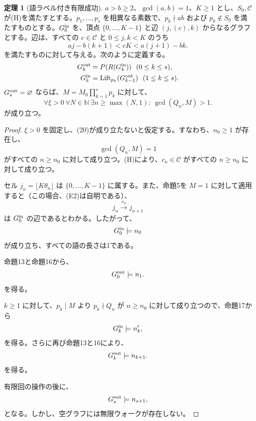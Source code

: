 \documentclass[11pt,reqno]{amsart}
\theoremstyle{definition}
\newtheorem{theorem}{定理}
\theoremstyle{definition}
\theoremstyle{remark}
\begin{document}
\begin{samepage}
\begin{theorem}[語ラベル付き有限成功]\leavevmode\label{thm:19}
\(a>b\ge2\)、\(\gcd(a,b)=1\)、\(K\ge1\) とし、\(S_0,\mathcal C\) が(H)を満たすとする。\(p_1,\ldots,p_s\) を相異なる素数で、\(p_k\nmid ab\) および \(p_k\notin S_0\) を満たすものとする。\(G_0^{\rm in}\) を、頂点 \(\{0,\ldots,K-1\}\) と辺 \((j,(c),k)\) からなるグラフとする。辺は、すべての \(c\in\mathcal C\) と \(0\le j,k<K\) のうち
\[
aj-b(k+1)<cK<a(j+1)-bk.
\]
を満たすものに対して与える。次のように定義する。
\[
\begin{aligned}
G_k^{\rm out}&=P(R(G_k^{\rm in}))\ \ (0\le k\le s),\\
G_k^{\rm in}&=\operatorname{Lift}_{p_k}(G_{k-1}^{\rm out})\ \ (1\le k\le s).
\end{aligned}
\]
\(G_s^{\rm out}=\varnothing\) ならば、\(M=M_0\prod_{k=1}^sp_k\) に対して、
\[
\forall\xi>0\ \forall N\in\mathbb N\ \exists n\ge\max(N,1):\
\gcd(Q_n,M)>1.
\tag{20}\label{eq:20}
\]
が成り立つ。
\label{thm-end:19}
\end{theorem}
\end{samepage}

\begin{proof}\leavevmode\label{proof:19}
\(\xi>0\) を固定し、(20)が成り立たないと仮定する。すなわち、\(n_0\ge1\) が存在し、
\[
\gcd(Q_n,M)=1
\]
がすべての \(n\ge n_0\) に対して成り立つ。(H)により、\(c_n\in\mathcal C\) がすべての \(n\ge n_0\) に対して成り立つ。

セル
\(j_n=\lfloor K\theta_n\rfloor\)
は \(\{0,\ldots,K-1\}\) に属する。また、命題5を \(M=1\) に対して適用すると（この場合、(E2)は自明である）、
\[
j_n\xrightarrow{c_n}j_{n+1}
\]
は \(G_0^{\rm in}\) の辺であるとわかる。したがって、
\[
G_0^{\rm in}\models n_0
\]
が成り立ち、すべての語の長さは1である。

命題13と命題16から、
\[
G_0^{\rm out}\models n_1.
\]
を得る。

\(k\ge1\) に対して、\(p_k\mid M\) より \(p_k\nmid Q_n\) が \(n\ge n_0\) に対して成り立つので、命題17から
\[
G_k^{\rm in}\models n'_k,
\]
を得る。さらに再び命題13と16により、
\[
G_k^{\rm out}\models n_{k+1}.
\]
を得る。

有限回の操作の後に、
\[
G_s^{\rm out}\models n_{s+1},
\]
となる。しかし、空グラフには無限ウォークが存在しない。\qedhere
\end{proof}
\end{document}
